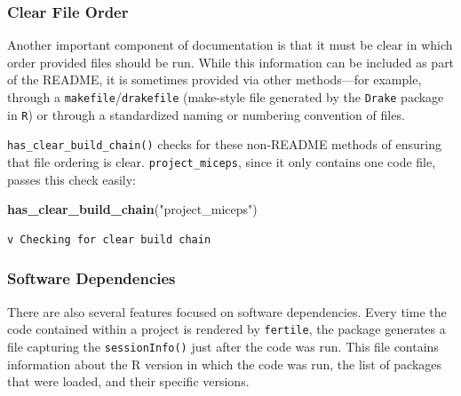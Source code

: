 \documentclass[12pt,twoside]{reedthesis}
\newenvironment{Shaded}{\begin{snugshade}}{\end{snugshade}}
\newcommand{\KeywordTok}[1]{\textcolor[rgb]{0.13,0.29,0.53}{\textbf{#1}}}
\newcommand{\StringTok}[1]{\textcolor[rgb]{0.31,0.60,0.02}{#1}}
\newcommand{\NormalTok}[1]{#1}
\begin{document}
\subsubsection{Clear File Order}\label{clear-file-order}

Another important component of documentation is that it must be clear in
which order provided files should be run. While this information can be
included as part of the README, it is sometimes provided via other
methods---for example, through a \texttt{makefile}/\texttt{drakefile}
(make-style file generated by the \texttt{Drake} package in \texttt{R})
or through a standardized naming or numbering convention of files.

\texttt{has\_clear\_build\_chain()} checks for these non-README methods
of ensuring that file ordering is clear. \texttt{project\_miceps}, since
it only contains one code file, passes this check easily:
\begin{Shaded}
\begin{Highlighting}[]
\KeywordTok{has_clear_build_chain}\NormalTok{(}\StringTok{"project_miceps"}\NormalTok{)}
\end{Highlighting}
\end{Shaded}
\begin{verbatim}
v Checking for clear build chain
\end{verbatim}
\subsubsection{Software Dependencies}\label{software-dependencies}

There are also several features focused on software dependencies. Every
time the code contained within a project is rendered by
\texttt{fertile}, the package generates a file capturing the
\texttt{sessionInfo()} just after the code was run. This file contains
information about the R version in which the code was run, the list of
packages that were loaded, and their specific versions.
\end{document}
